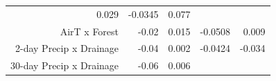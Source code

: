 \documentclass[]{article}
\begin{document}
\begin{longtable}[]{@{}rrrrr@{}}
\begin{minipage}[t]{0.07\columnwidth}
0.029\strut
\end{minipage} & \begin{minipage}[t]{0.10\columnwidth}\raggedleft\strut
-0.0345\strut
\end{minipage} & \begin{minipage}[t]{0.10\columnwidth}\raggedleft\strut
0.077\strut
\end{minipage}\tabularnewline
\begin{minipage}[t]{0.37\columnwidth}\raggedleft\strut
AirT x Forest\strut
\end{minipage} & \begin{minipage}[t]{0.08\columnwidth}\raggedleft\strut
-0.02\strut
\end{minipage} & \begin{minipage}[t]{0.07\columnwidth}\raggedleft\strut
0.015\strut
\end{minipage} & \begin{minipage}[t]{0.10\columnwidth}\raggedleft\strut
-0.0508\strut
\end{minipage} & \begin{minipage}[t]{0.10\columnwidth}\raggedleft\strut
0.009\strut
\end{minipage}\tabularnewline
\begin{minipage}[t]{0.37\columnwidth}\raggedleft\strut
2-day Precip x Drainage\strut
\end{minipage} & \begin{minipage}[t]{0.08\columnwidth}\raggedleft\strut
-0.04\strut
\end{minipage} & \begin{minipage}[t]{0.07\columnwidth}\raggedleft\strut
0.002\strut
\end{minipage} & \begin{minipage}[t]{0.10\columnwidth}\raggedleft\strut
-0.0424\strut
\end{minipage} & \begin{minipage}[t]{0.10\columnwidth}\raggedleft\strut
-0.034\strut
\end{minipage}\tabularnewline
\begin{minipage}[t]{0.37\columnwidth}\raggedleft\strut
30-day Precip x Drainage\strut
\end{minipage} & \begin{minipage}[t]{0.08\columnwidth}\raggedleft\strut
-0.06\strut
\end{minipage} & \begin{minipage}[t]{0.07\columnwidth}\raggedleft\strut
0.006\strut
\end{minipage} & \begin{minipage}[t]{0.10\columnwidth}\raggedleft\strut

\end{minipage}
\end{longtable}
\end{document}
